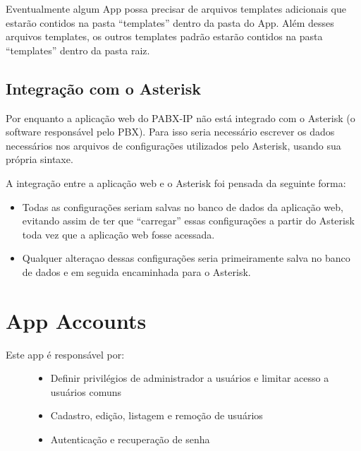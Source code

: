 \documentclass[letterpaper,10pt,brazil]{sphinxmanual}
\begin{document}
Eventualmente algum App possa precisar de arquivos templates adicionais que estarão contidos na pasta ``templates'' dentro da pasta do App. Além desses arquivos templates, os outros templates padrão estarão contidos na pasta ``templates'' dentro da pasta raiz.


\subsection{Integração com o Asterisk}
\label{codigo:integracao-com-o-asterisk}
Por enquanto a aplicação web do PABX-IP não está integrado com o Asterisk (o software responsável pelo PBX). Para isso seria necessário escrever os dados necessários nos arquivos de configurações utilizados pelo Asterisk, usando sua própria sintaxe.

A integração entre a aplicação web e o Asterisk foi pensada da seguinte forma:
\begin{itemize}
\item {} 
Todas as configurações seriam salvas no banco de dados da aplicação web, evitando assim de ter que ``carregar'' essas configurações a partir do Asterisk toda vez que a aplicação web fosse acessada.

\item {} 
Qualquer alteraçao dessas configurações seria primeiramente salva no banco de dados e em seguida encaminhada para o Asterisk.

\end{itemize}


\section{App Accounts}
\label{apps/accounts:accounts}\label{apps/accounts:app-accounts}\label{apps/accounts::doc}\begin{description}
\item[{Este app é responsável por:}] \leavevmode\begin{itemize}
\item {} 
Definir privilégios de administrador a usuários e limitar acesso a usuários comuns

\item {} 
Cadastro, edição, listagem e remoção de usuários

\item {} 
Autenticação e recuperação de senha

\end{itemize}

\end{description}
\end{document}
